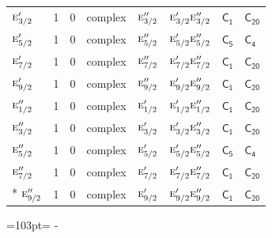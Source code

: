 \documentclass[10pt,a4paper]{article}
\newcommand{\needspace}[1]{\par\penalty-100\begingroup\dimen0=#1\relax\dimen2=\pagegoal
  \advance\dimen2-\pagetotal\ifdim\dimen0>\dimen2\relax\ifdim\dimen2>0pt\vfil\break\fi\fi
  \endgroup}
\numberwithin{equation}{section}
\newcommand{\grp}[1]{\mathsf{#1}}
\newcommand{\irr}[1]{\text{\normalfont\scshape #1}}
\begin{document}
{\begin{longtable}{@{}lrrlllll@{}}
$\irr{e}_{3/2}'$ & 1 & $0$ & complex & $\irr{e}_{3/2}''$ & $\irr{e}_{3/2}'\irr{e}_{3/2}''$ & \href{C1.pdf}{$\grp{C_{1}}$} & $\grp{C_{20}}$\\
$\irr{e}_{5/2}'$ & 1 & $0$ & complex & $\irr{e}_{5/2}''$ & $\irr{e}_{5/2}'\irr{e}_{5/2}''$ & \href{C5.pdf}{$\grp{C_{5}}$} & \href{../../../rotation/data/pdf/C4.pdf}{$\grp{C_{4}}$}\\
$\irr{e}_{7/2}'$ & 1 & $0$ & complex & $\irr{e}_{7/2}''$ & $\irr{e}_{7/2}'\irr{e}_{7/2}''$ & \href{C1.pdf}{$\grp{C_{1}}$} & $\grp{C_{20}}$\\
$\irr{e}_{9/2}'$ & 1 & $0$ & complex & $\irr{e}_{9/2}''$ & $\irr{e}_{9/2}'\irr{e}_{9/2}''$ & \href{C1.pdf}{$\grp{C_{1}}$} & $\grp{C_{20}}$\\
$\irr{e}_{1/2}''$ & 1 & $0$ & complex & $\irr{e}_{1/2}'$ & $\irr{e}_{1/2}'\irr{e}_{1/2}''$ & \href{C1.pdf}{$\grp{C_{1}}$} & $\grp{C_{20}}$\\
$\irr{e}_{3/2}''$ & 1 & $0$ & complex & $\irr{e}_{3/2}'$ & $\irr{e}_{3/2}'\irr{e}_{3/2}''$ & \href{C1.pdf}{$\grp{C_{1}}$} & $\grp{C_{20}}$\\
$\irr{e}_{5/2}''$ & 1 & $0$ & complex & $\irr{e}_{5/2}'$ & $\irr{e}_{5/2}'\irr{e}_{5/2}''$ & \href{C5.pdf}{$\grp{C_{5}}$} & \href{../../../rotation/data/pdf/C4.pdf}{$\grp{C_{4}}$}\\
$\irr{e}_{7/2}''$ & 1 & $0$ & complex & $\irr{e}_{7/2}'$ & $\irr{e}_{7/2}'\irr{e}_{7/2}''$ & \href{C1.pdf}{$\grp{C_{1}}$} & $\grp{C_{20}}$\\*
$\irr{e}_{9/2}''$ & 1 & $0$ & complex & $\irr{e}_{9/2}'$ & $\irr{e}_{9/2}'\irr{e}_{9/2}''$ & \href{C1.pdf}{$\grp{C_{1}}$} & $\grp{C_{20}}$\\
\bottomrule\end{longtable}}
\needspace{103pt}
\end{document}
